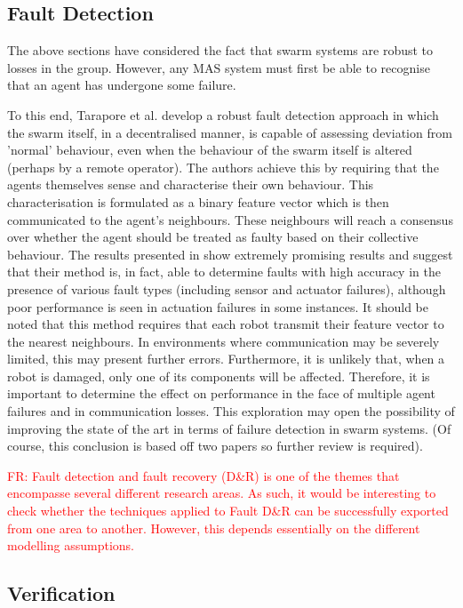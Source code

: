 \documentclass[preprint,11pt]{report}
\newcommand\fr[1]{\textcolor{red}{FR: #1}}
\begin{document}
\subsection{Fault Detection}

The above sections have considered the fact that swarm systems are
robust to losses in the group.  However, any MAS system must first be
able to recognise that an agent has undergone some failure.

To this end, Tarapore et al. \cite{Tarapore2019FaultDetection} develop
a robust fault detection approach in which the swarm itself, in a
decentralised manner, is capable of assessing deviation from 'normal'
behaviour, even when the behaviour of the swarm itself is altered
(perhaps by a remote operator). The authors achieve this by requiring
that the agents themselves sense and characterise their own
behaviour. This characterisation is formulated as a binary feature
vector which is then communicated to the agent's neighbours. These
neighbours will reach a consensus over whether the agent should be
treated as faulty based on their collective behaviour. The results
presented in \cite{Tarapore2019FaultDetection} show extremely
promising results and suggest that their method is, in fact, able to
determine faults with high accuracy in the presence of various fault
types (including sensor and actuator failures), although poor
performance is seen in actuation failures in some instances. It should
be noted that this method requires that each robot transmit their
feature vector to the nearest neighbours. In environments where
communication may be severely limited, this may present further
errors. Furthermore, it is unlikely that, when a robot is damaged,
only one of its components will be affected. Therefore, it is
important to determine the effect on performance in the face of
multiple agent failures and in communication losses. This exploration
may open the possibility of improving the state of the art in terms of
failure detection in swarm systems. (Of course, this conclusion is
based off two papers so further review is required).

\fr{Fault detection and fault recovery (D\&R) is one of the themes that encompasse several different research areas. As such, it would be interesting to check whether the techniques applied to Fault D\&R can be successfully exported from one area to another. However, this depends essentially on the different modelling assumptions.}

\subsection{Verification}
\end{document}
